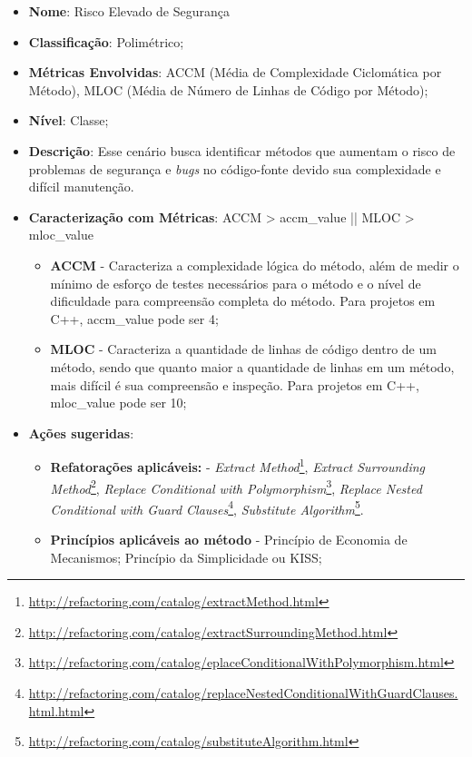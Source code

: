 \begin{itemize}
\item \textbf{Nome}: Risco Elevado de Segurança
\item \textbf{Classificação}: Polimétrico;
\item \textbf{Métricas Envolvidas}: ACCM (Média de Complexidade Ciclomática por Método), MLOC (Média de Número de Linhas de Código por Método);
\item \textbf{Nível}: Classe;
\item \textbf{Descrição}: Esse cenário busca identificar métodos que aumentam o risco de problemas de segurança e \emph{bugs} no código-fonte devido sua complexidade e difícil manutenção.
\item \textbf{Caracterização com Métricas}: ACCM > accm\_value || MLOC > mloc\_value
	\begin{itemize}
	\item \textbf{ACCM} - Caracteriza a complexidade lógica do método, além de medir o mínimo de esforço de testes necessários para o método e o nível de dificuldade para compreensão completa do método. Para projetos em C++, accm\_value pode ser 4;
	\item \textbf{MLOC} - Caracteriza a quantidade de linhas de código dentro de um método, sendo que quanto maior a quantidade de linhas em um método, mais difícil é sua compreensão e inspeção. Para projetos em C++, mloc\_value pode ser 10;
	\end{itemize}
\item \textbf{Ações sugeridas}:
	\begin{itemize}
	\item \textbf{Refatorações aplicáveis:} - \emph{Extract Method}\footnote{\url{http://refactoring.com/catalog/extractMethod.html}},  \emph{Extract Surrounding Method}\footnote{\url{http://refactoring.com/catalog/extractSurroundingMethod.html}}, \emph{Replace Conditional with Polymorphism}\footnote{\url{http://refactoring.com/catalog/eplaceConditionalWithPolymorphism.html}}, \emph{Replace Nested Conditional with Guard Clauses}\footnote{\url{http://refactoring.com/catalog/replaceNestedConditionalWithGuardClauses.html.html}}, \emph{Substitute Algorithm}\footnote{\url{http://refactoring.com/catalog/substituteAlgorithm.html}}.
	\item \textbf{Princípios aplicáveis ao método} - Princípio de Economia de Mecanismos; Princípio da Simplicidade ou KISS;
	\end{itemize}
\end{itemize}




